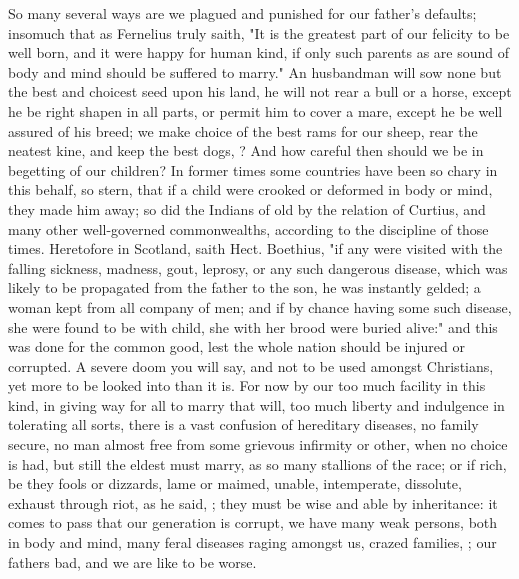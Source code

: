 So many several ways are we plagued and punished for our father's defaults;
insomuch that as Fernelius truly saith, "It is the
greatest part of our felicity to be well born, and it were happy for human
kind, if only such parents as are sound of body and mind should be suffered to
marry." An husbandman will sow none but the best and choicest seed upon his
land, he will not rear a bull or a horse, except he be right shapen in all
parts, or permit him to cover a mare, except he be well assured of his breed;
we make choice of the best rams for our sheep, rear the neatest kine, and keep
the best dogs, ?
And how careful then should we be in begetting of our children? In former times
some countries have been so chary in this behalf, so
stern, that if a child were crooked or deformed in body or mind, they made him
away; so did the Indians of old by the relation of Curtius, and many other
well-governed commonwealths, according to the discipline of those times.
Heretofore in Scotland, saith Hect. Boethius, "if any were
visited with the falling sickness, madness, gout, leprosy, or any such
dangerous disease, which was likely to be propagated from the father to the
son, he was instantly gelded; a woman kept from all company of men; and if by
chance having some such disease, she were found to be with child, she with her
brood were buried alive:" and this was done for the common good, lest the whole
nation should be injured or corrupted. A severe doom you will say, and not to
be used amongst Christians, yet more to be looked into than it is. For now by
our too much facility in this kind, in giving way for all to marry that will,
too much liberty and indulgence in tolerating all sorts, there is a vast
confusion of hereditary diseases, no family secure, no man almost free from
some grievous infirmity or other, when no choice is had, but still the eldest
must marry, as so many stallions of the race; or if rich, be they fools or
dizzards, lame or maimed, unable, intemperate, dissolute, exhaust through riot,
as he said, ; they
must be wise and able by inheritance: it comes to pass that our generation is
corrupt, we have many weak persons, both in body and mind, many feral diseases
raging amongst us, crazed families, ; our fathers
bad, and we are like to be worse.

